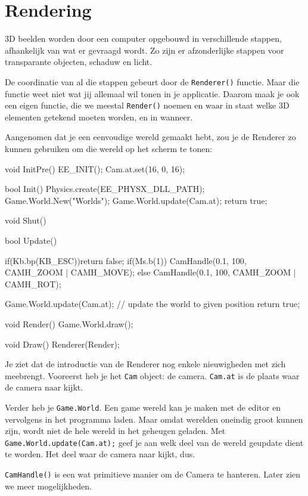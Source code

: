 \chapter{Rendering}
3D beelden worden door een computer opgebouwd in verschillende stappen, afhankelijk van wat er gevraagd wordt. Zo zijn er afzonderlijke stappen voor transparante objecten, schaduw en licht.

De coordinatie van al die stappen gebeurt door de \texttt{Renderer()} functie. Maar die functie weet niet wat jij allemaal wil tonen in je applicatie. Daarom maak je ook een eigen functie, die we meestal \texttt{Render()} noemen en waar in staat welke 3D elementen getekend moeten worden, en in wanneer.

Aangenomen dat je een eenvoudige wereld gemaakt hebt, zou je de Renderer zo kunnen gebruiken om die wereld op het scherm te tonen:

\begin{code}
void InitPre()
{
   EE_INIT();
   Cam.at.set(16, 0, 16);
}

bool Init()
{
   Physics.create(EE_PHYSX_DLL_PATH);
   Game.World.New("Worlds\Sample"); 
   Game.World.update(Cam.at); 
   return true;
}

void Shut() {}

bool Update()
{
   if(Kb.bp(KB_ESC))return false;
   if(Ms.b(1)) {
      CamHandle(0.1, 100, CAMH_ZOOM | CAMH_MOVE);
   } else {
      CamHandle(0.1, 100, CAMH_ZOOM | CAMH_ROT);
   }

   Game.World.update(Cam.at); // update the world to given position
   return true;
}

void Render()
{
   Game.World.draw();
}

void Draw()
{
   Renderer(Render);
}

\end{code}

Je ziet dat de introductie van de Renderer nog enkele nieuwigheden met zich meebrengt. Vooreerst heb je het \texttt{Cam} object: de camera. \texttt{Cam.at} is de plaats waar de camera naar kijkt.

Verder heb je \texttt{Game.World}. Een game wereld kan je maken met de editor en vervolgens in het programma laden. Maar omdat werelden oneindig groot kunnen zijn, wordt niet de hele wereld in het geheugen geladen. Met \texttt{Game.World.update(Cam.at);} geef je aan welk deel van de wereld geupdate dient te worden. Het deel waar de camera naar kijkt, dus.  

\texttt{CamHandle()} is een wat primitieve manier om de Camera te hanteren. Later zien we meer mogelijkheden.

